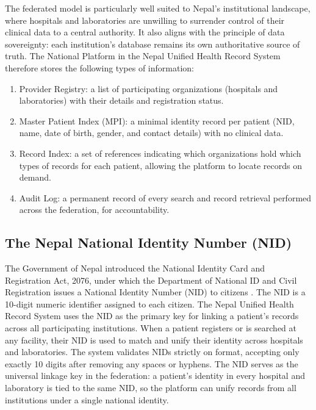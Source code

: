 \documentclass[12pt]{report}
\numberwithin{equation}{chapter}
\begin{document}
The federated model is particularly well suited to Nepal's institutional landscape, where hospitals and laboratories are unwilling to surrender control of their clinical data to a central authority. It also aligns with the principle of data sovereignty: each institution's database remains its own authoritative source of truth. The National Platform in the Nepal Unified Health Record System therefore stores the following types of information:
\begin{enumerate}
    \item Provider Registry: a list of participating organizations (hospitals and laboratories) with their details and registration status.
    \item Master Patient Index (MPI): a minimal identity record per patient (NID, name, date of birth, gender, and contact details) with no clinical data.
    \item Record Index: a set of references indicating which organizations hold which types of records for each patient, allowing the platform to locate records on demand.
    \item Audit Log: a permanent record of every search and record retrieval performed across the federation, for accountability.
\end{enumerate}

\subsection{The Nepal National Identity Number (NID)}
The Government of Nepal introduced the National Identity Card and Registration Act, 2076, under which the Department of National ID and Civil Registration issues a National Identity Number (NID) to citizens \cite{nidact}. The NID is a 10-digit numeric identifier assigned to each citizen. The Nepal Unified Health Record System uses the NID as the primary key for linking a patient's records across all participating institutions. When a patient registers or is searched at any facility, their NID is used to match and unify their identity across hospitals and laboratories. The system validates NIDs strictly on format, accepting only exactly 10 digits after removing any spaces or hyphens. The NID serves as the universal linkage key in the federation: a patient's identity in every hospital and laboratory is tied to the same NID, so the platform can unify records from all institutions under a single national identity.

\end{document}
